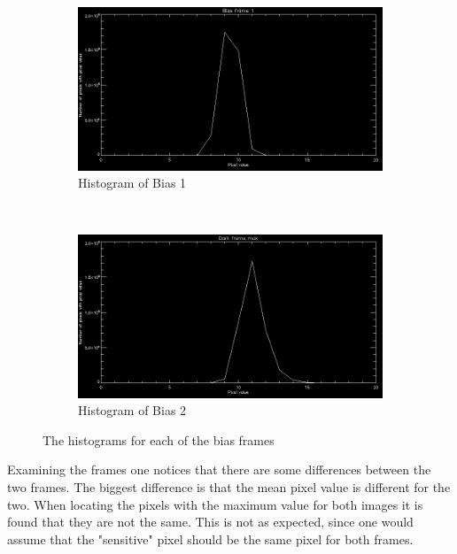 \documentclass[a4paper,12pt]{article}
\begin{document}
\begin{figure}[H]
        \centering
        \begin{subfigure}[H]{0.5\textwidth}
                \includegraphics[width=\textwidth]{histogram1.png}
                \caption{Histogram of Bias 1}
                \label{fig:histbias1}
        \end{subfigure}%
        ~ %
        \begin{subfigure}[H]{0.5\textwidth}
                \includegraphics[width=\textwidth]{histogram2.png}
                \caption{Histogram of Bias 2}
                \label{fig:histbias2}
        \end{subfigure}
        \caption{The histograms for each of the bias frames}\label{fig:histograms}
\end{figure}

Examining the frames one notices that there are some differences between the two frames. The biggest difference is that the mean pixel value is different for the two. When locating the pixels with the maximum value for both images it is found that they are not the same. This is not as expected, since one would assume that the "sensitive" pixel should be the same pixel for both frames.
\end{document}
